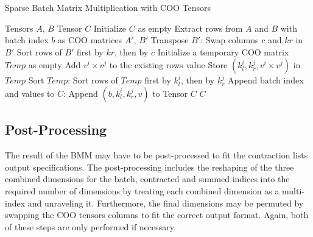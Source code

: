 \begin{algorithm}[H]
    \caption{Sparse Batch Matrix Multiplication with COO Tensors}
    \label{alg:bmm}
    \begin{algorithmic}[1]
        \REQUIRE Tensors $A$, $B$
        \ENSURE Tensor $C$
        \STATE Initialize $C$ as empty
            \STATE Extract rows from $A$ and $B$ with batch index $b$ as COO matrices $A'$, $B'$
            \STATE Transpose $B'$:
            \STATE Swap columns $c$ and $kr$ in $B'$
            \STATE Sort rows of $B'$ first by $kr$, then by $c$
            \STATE Initialize a temporary COO matrix $Temp$ as empty
                        \STATE Add $v^i \times v^j$ to the existing rows value
                    \ELSE
                        \STATE Store $(k_l^i, k_r^j, v^i \times v^j)$ in $Temp$
                    \ENDIF
                \ENDFOR
            \ENDFOR
            \STATE Sort $Temp$:
            \STATE Sort rows of $Temp$ first by $k_l^i$, then by $k_r^j$
            \STATE Append batch index and values to $C$:
                \STATE Append $(b, k_l^i, k_r^j, v)$ to Tensor $C$
            \ENDFOR
        \ENDFOR
        \RETURN $C$
    \end{algorithmic}
\end{algorithm}
    
\subsection{Post-Processing}
The result of the BMM may have to be post-processed to fit the contraction lists output
specifications. The post-processing includes the reshaping of the three combined dimensions for
the batch, contracted and summed indices into the required number of dimensions by treating
each combined dimension as a multi-index and unraveling it. Furthermore, the final dimensions
may be permuted by swapping the COO tensors columns to fit the correct output format. Again,
both of these steps are only performed if necessary.

